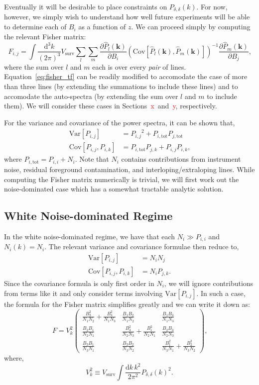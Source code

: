 \documentclass{aastex62}
\newcommand{\Gus}[1]{\textcolor{red}{#1}}
\newcommand{\beq}{\begin{equation}}
\newcommand{\eeq}{\end{equation}}
\newcommand{\ps}[1]{\ensuremath{P_{#1,#1}}}
\newcommand{\xps}[2]{\ensuremath{P_{#1,#2}}}
\newcommand{\denps}{\ensuremath{P_{\delta,\delta}}}
\newcommand{\pstot}[1]{\ensuremath{P_{#1,\text{tot}}}}
\newcommand{\Var}[1]{\mathrm{Var}[#1]}
\newcommand{\Cov}[2]{\mathrm{Cov}[#1,#2]}
\begin{document}
Eventually it will be desirable to place constraints on $\denps(k)$. For now,
however, we simply wish to understand how well future experiments will be able
to determine each of $B_i$ as a function of $z$. We can proceed simply by
computing the relevant Fisher matrix:
\beq\label{eq:fisher_tf}
F_{i,j} = 
\int \frac{\text{d}^3k}{(2\pi)^3} V_{\text{surv}}
\sum_{l} \sum_{m}
\frac{\partial \hat{P}_{l}(\bm{k})}{\partial B_i}
\left(\Cov{\hat{P}_{l}(\bm{k})}{\hat{P}_{m}(\bm{k})}\right)^{-1}
\frac{\partial \hat{P}_{m}(\bm{k})}{\partial B_j}\text{,}
\eeq
where the sum over $l$ and $m$ each is over every \emph{pair} of lines.
Equation~\ref{eq:fisher_tf} can be readily modified to accomodate the case of
more than three lines (by extending the summations to include these lines) and
to accomodate the auto-spectra (by extending the sum over $l$ and $m$ to
include them). We will consider these cases in Sections~\Gus{x}~and~\Gus{y},
respectively.

For the variance and covariance of the power spectra, it can be shown that,
\beq\label{eq:var_cov}
\begin{split}
\Var{\xps{i}{j}} &= \xps{i}{j}^2 + \pstot{i}\pstot{j} \\
\Cov{\xps{i}{j}}{\xps{i}{k}} &= \pstot{i}\xps{j}{k} +
\xps{i}{j}\xps{i}{k}\text{,}
\end{split}
\eeq
where $\pstot{i} = \ps{i} + N_i$. Note that $N_i$ contains contributions
from instrument noise, residual foreground contamination, and
interloping/extraloping lines. While computing the Fisher matrix numerically
is trivial, we will first work out the noise-dominated case which has a
somewhat tractable analytic solution.

\subsection{White Noise-dominated Regime} \label{ssec:tf_noisedom}
In the white noise-dominated regime, we have that each $N_i \gg \ps{i}$ and
$N_i(k) = N_i$. The relevant variance and covariance formulae then reduce to,
\beq\label{eq:var_cov}
\begin{split}
\Var{\xps{i}{j}} &= N_iN_j \\
\Cov{\xps{i}{j}}{\xps{i}{k}} &= N_i\xps{j}{k}\text{.}
\end{split}
\eeq
Since the covariance formula is only first order in $N_i$, we will ignore
contributions from terms like it and only consider terms involving
$\Var{\xps{i}{j}}$. In such a case, the formula for the Fisher matrix
simplifies greatly and we can write it down as:
\beq \label{eq:fmat_tf_exp}
F = V_k^2
\begin{pmatrix}
\frac{B_2^2}{N_1N_2}+\frac{B_3^2}{N_1N_3} & \frac{B_1B_2}{N_1N_2} & \frac{B_1B_3}{N_1N_3} \\
\frac{B_2B_1}{N_2N_1} & \frac{B_3^2}{N_2N_3}+\frac{B_1^2}{N_2N_1} & \frac{B_2B_3}{N_2N_3} \\
\frac{B_3B_1}{N_3N_1} & \frac{B_3B_2}{N_3N_2} & \frac{B_1^2}{N_3N_1}+\frac{B_2^2}{N_3N_2}
\end{pmatrix}
\text{,}
\eeq
where,
\beq \label{eq:Vk}
V_k^2 \equiv V_{\text{surv}} \int \frac{\text{d}k\,k^2}{2\pi^2} \denps(k)^2\text{.}
\eeq
\end{document}
